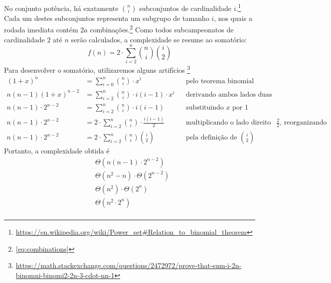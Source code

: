 \documentclass{article}
\begin{document}
\noindent No conjunto potência, há exatamente $\binom{n}{i}$ subconjuntos de cardinalidade $i$.\footnote{\url{https://en.wikipedia.org/wiki/Power_set\#Relation_to_binomial_theorem}} Cada um destes subconjuntos representa um subgrupo de tamanho $i$, nos quais a rodada imediata contém $2a$ combinações.\footnote{\autoref{eq:combinations}} Como todos subcampeonatos de cardinalidade $2$ até $n$ serão calculados, a complexidade se resume ao somatório:
\[ f(n) = 2 \cdot \sum_{i=2}^n \binom{n}{i} \binom{i}{2} \]
Para desenvolver o somatório, utilizaremos alguns artifícios \footnote{\url{https://math.stackexchange.com/questions/2472972/prove-that-sum-i-2n-binomni-binomi2-2n-3-cdot-nn-1}}
\begin{align*}
  {(1 + x)}^n &= \sum_{i=0}^n \binom{n}{i} \cdot x^i && \text{pelo teorema binomial} \\
  n(n - 1){(1 + x)}^{n - 2} &= \sum_{i = 2}^n \binom{n}{i} \cdot i(i - 1) \cdot x^i && \text{derivando ambos lados duas vezes} \\
  n(n - 1) \cdot 2^{n - 2} &= \sum_{i = 2}^n \binom{n}{i} \cdot i(i - 1) && \text{substituindo $x$ por $1$} \\
  n(n - 1) \cdot 2^{n - 2} &= 2 \cdot \sum_{i = 2}^n \binom{n}{i} \cdot \frac{i(i - 1)}{2} && \text{multiplicando o lado direito por $\frac{2}{2}$, reorganizando} \\
  n(n - 1) \cdot 2^{n - 2} &= 2 \cdot \sum_{i = 2}^n \binom{n}{i} \binom{i}{2} && \text{pela definição de $\binom{i}{2}$}
\end{align*}
Portanto, a complexidade obtida é
\begin{align*}
  & \Theta \left( n(n - 1) \cdot 2^{n - 2} \right) \\
  & \Theta \left( n^2 - n \right) \cdot \Theta \left( 2^{n - 2} \right) \\
  & \Theta \left( n^2 \right) \cdot \Theta \left( 2^n \right) \\
  & \Theta \left( n^2 \cdot 2^n \right) \\
\end{align*}


\pagebreak
\end{document}
